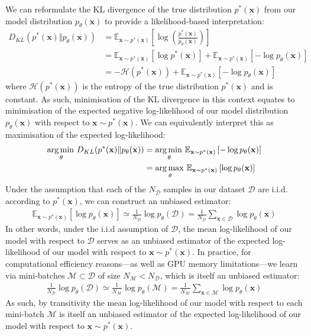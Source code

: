 \documentclass[ oneside,%
                    author={George Herbert},
                    degree={MSci},
                     title={Video Diffusion Models for Climate Simulations},
                  subtitle={}]{dissertation}
\begin{document}
We can reformulate the KL divergence of the true distribution $p^*(\mathbf{x})$ from our model distribution $p_\theta(\mathbf{x})$ to provide a likelihood-based interpretation:
\begin{align}
      D_{KL}(p^*(\mathbf{x})\Vert p_\theta(\mathbf{x}))&=\mathbb{E}_{\mathbf{x}\sim p^*(\mathbf{x})}\left[\log\left(\frac{p^*(\mathbf{x})}{p_\theta(\mathbf{x})}\right)\right]\\
      &=\mathbb{E}_{\mathbf{x}\sim p^*(\mathbf{x})}\left[\log p^*(\mathbf{x})\right]+\mathbb{E}_{\mathbf{x}\sim p^*(\mathbf{x})}\left[-\log p_\theta(\mathbf{x})\right]\\
      &=-\mathcal{H}(p^*(\mathbf{x}))+\mathbb{E}_{\mathbf{x}\sim p^*(\mathbf{x})}\left[-\log p_\theta(\mathbf{x})\right]
\end{align}
where $\mathcal{H}{(p^*(\mathbf{x}))}$ is the entropy of the true distribution $p^*(\mathbf{x})$ and is constant. As such, minimisation of the KL divergence in this context equates to minimisation of the expected negative log-likelihood of our model distribution $p_\theta(\mathbf{x})$ with respect to $\mathbf{x}\sim p^*(\mathbf{x})$. We can equivalently interpret this as maximisation of the expected log-likelihood:
\begin{align}
      \operatorname*{arg\,min\,}_\theta D_{KL}(p^*(\mathbf{x})\Vert p_\theta(\mathbf{x}))&=\operatorname*{arg\,min\,}_\theta \mathbb{E}_{\mathbf{x}\sim p^*(\mathbf{x})}\left[-\log p_\theta(\mathbf{x})\right]\\
      &=\operatorname*{arg\,max\,}_{\theta}\mathbb{E}_{\mathbf{x}\sim p^*(\mathbf{x})}\left[\log p_\theta(\mathbf{x})\right]
\end{align}
Under the assumption that each of the $N_\mathcal{D}$ samples in our dataset $\mathcal{D}$ are i.i.d. according to $p^*(\mathbf{x})$, we can construct an unbiased estimator:
\begin{align}
      \mathbb{E}_{\mathbf{x}\sim p^*(\mathbf{x})}\left[\log p_\theta(\mathbf{x})\right]\simeq \frac{1}{N_{\mathcal{D}}}\log p_\theta(\mathcal{D}) = \frac{1}{N_{\mathcal{D}}} \sum_{\mathbf{x}\in\mathcal{D}} \log p_\theta(\mathbf{x})
\end{align}
In other words, under the i.i.d assumption of $\mathcal{D}$, the mean log-likelihood of our model with respect to $\mathcal{D}$ serves as an unbiased estimator of the expected log-likelihood of our model with respect to $\mathbf{x}\sim p^*(\mathbf{x})$. In practice, for computational efficiency reasons---as well as GPU memory limitations---we learn via mini-batches $\mathcal{M}\subset \mathcal{D}$ of size $N_\mathcal{M} < N_\mathcal{D}$, which is itself an unbiased estimator:
\begin{align}
      \frac{1}{N_\mathcal{D}}\log p_\theta(\mathcal{D})\simeq \frac{1}{N_\mathcal{M}}\log p_\theta(\mathcal{M})=\frac{1}{N_\mathcal{M}}\sum_{\mathbf{x}\in\mathcal{M}}\log p_\theta(\mathbf{x})
\end{align}
As such, by transitivity the mean log-likelihood of our model with respect to each mini-batch $\mathcal{M}$ is itself an unbiased estimator of the expected log-likelihood of our model with respect to $\mathbf{x}\sim p^*(\mathbf{x})$.
\end{document}
